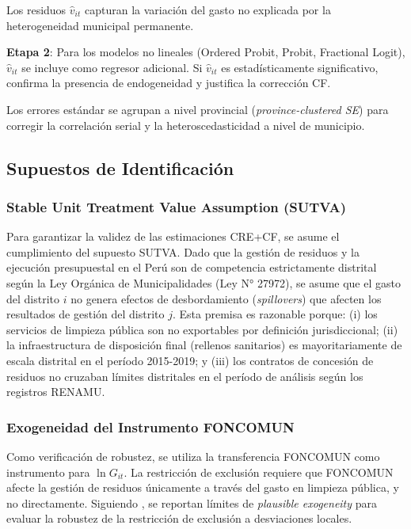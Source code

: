 \noindent Los residuos $\hat{v}_{it}$ capturan la variación del gasto no explicada por la heterogeneidad municipal permanente.

\textbf{Etapa 2}: Para los modelos no lineales (Ordered Probit, Probit, Fractional Logit), $\hat{v}_{it}$ se incluye como regresor adicional.
Si $\hat{v}_{it}$ es estadísticamente significativo, confirma la presencia de endogeneidad y justifica la corrección CF.

Los errores estándar se agrupan a nivel provincial (\textit{province-clustered SE}) para corregir la correlación serial y la heteroscedasticidad a nivel de municipio.

\subsection{Supuestos de Identificación}
\label{sec:supuestos}

\subsubsection*{Stable Unit Treatment Value Assumption (SUTVA)}

Para garantizar la validez de las estimaciones CRE+CF, se asume el cumplimiento del supuesto SUTVA.
Dado que la gestión de residuos y la ejecución presupuestal en el Perú son de competencia estrictamente distrital según la Ley Orgánica de Municipalidades (Ley N° 27972), se asume que el gasto del distrito $i$ no genera efectos de desbordamiento (\textit{spillovers}) que afecten los resultados de gestión del distrito $j$.
Esta premisa es razonable porque: (i) los servicios de limpieza pública son no exportables por definición jurisdiccional; (ii) la infraestructura de disposición final (rellenos sanitarios) es mayoritariamente de escala distrital en el período 2015-2019; y (iii) los contratos de concesión de residuos no cruzaban límites distritales en el período de análisis según los registros RENAMU.

\subsubsection*{Exogeneidad del Instrumento FONCOMUN}

Como verificación de robustez, se utiliza la transferencia FONCOMUN como instrumento para $\ln G_{it}$.
La restricción de exclusión requiere que FONCOMUN afecte la gestión de residuos únicamente a través del gasto en limpieza pública, y no directamente.
Siguiendo \citet{ConleyHansenRossi2012}, se reportan límites de \textit{plausible exogeneity} para evaluar la robustez de la restricción de exclusión a desviaciones locales.

